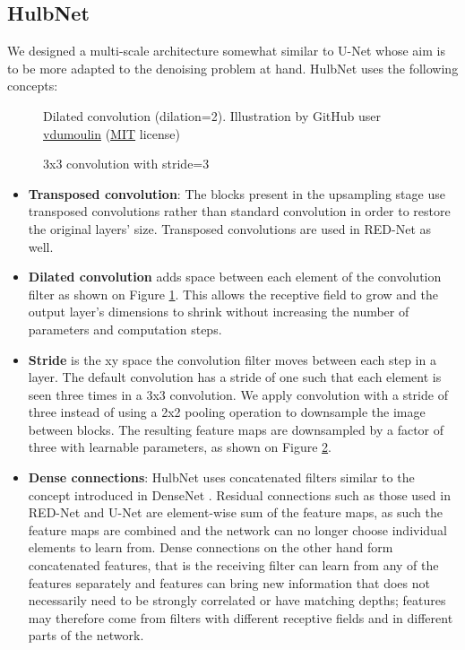 \subsection{HulbNet}
We designed a multi-scale architecture somewhat similar to U-Net whose aim is to be more adapted to the denoising problem at hand. HulbNet uses the following concepts:
\begin{figure}
  \begin{center}
    \caption[Dilated convolution]{Dilated convolution (dilation=2). Illustration by GitHub user \href{https://github.com/vdumoulin/conv\_arithmetic}{vdumoulin} (\href{https://github.com/vdumoulin/conv\_arithmetic/blob/master/LICENSE}{MIT} license)}
    \label{fig:dilated}
  \end{center}
\end{figure}
\begin{figure}
  \begin{center}
      
    \caption[Strided convolution]{3x3 convolution with stride=3}
    \label{fig:str3}
  \end{center}
\end{figure}
\begin{itemize}
  \item \textbf{Transposed convolution}: The blocks present in the upsampling stage use transposed convolutions rather than standard convolution in order to restore the original layers' size. Transposed convolutions are used in RED-Net as well.
  \item \textbf{Dilated convolution} adds space between each element of the convolution filter as shown on Figure \ref{fig:dilated}. This allows the receptive field to grow and the output layer's dimensions to shrink without increasing the number of parameters and computation steps.
  \item \textbf{Stride} is the xy space the convolution filter moves between each step in a layer. The default convolution has a stride of one such that each element is seen three times in a 3x3 convolution. We apply convolution with a stride of three instead of using a 2x2 pooling operation to downsample the image between blocks. The resulting feature maps are downsampled by a factor of three with learnable parameters, as shown on Figure \ref{fig:str3}.
  \item \textbf{Dense connections}: HulbNet uses concatenated filters similar to the concept introduced in DenseNet \cite{densenet}. Residual connections such as those used in \ac{RED-Net} \cite{rednet} and U-Net \cite{unet} are element-wise sum of the feature maps, as such the feature maps are combined and the network can no longer choose individual elements to learn from. Dense connections on the other hand form concatenated features, that is the receiving filter can learn from any of the features separately and features can bring new information that does not necessarily need to be strongly correlated or have matching depths; features may therefore come from filters with different receptive fields and in different parts of the network.
\end{itemize}
